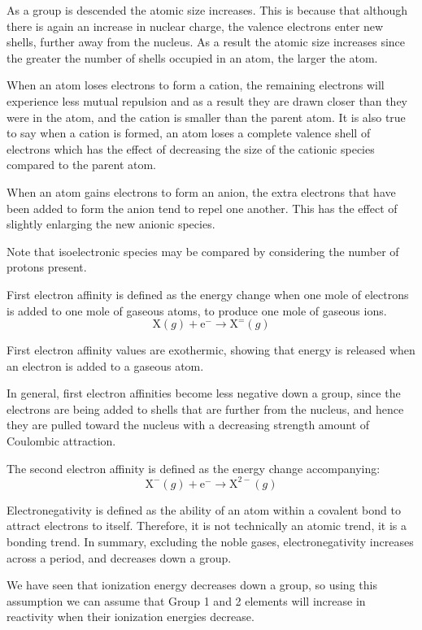 \documentclass[../chem.tex]{subfiles}
\begin{document}
As a group is descended the atomic size increases. This is because that although there is again an increase in nuclear charge, the valence 
electrons enter new shells, further away from the nucleus. As a result the atomic size increases since the greater the number of shells occupied in an atom, the larger the atom.

When an atom loses electrons to form a cation, the remaining electrons will experience less mutual repulsion and as a result they are drawn 
closer than they were in the atom, and the cation is smaller than the parent atom. It is also true to say when a cation is formed, an atom loses a 
complete valence shell of electrons which has the effect of decreasing the size of the cationic species compared to the parent atom.

When an atom gains electrons to form an anion, the extra electrons that have been added to form the anion tend to repel one another.
This has the effect of slightly enlarging the new anionic species.

Note that isoelectronic species may be compared by considering the number of protons present.

First electron affinity is defined as the energy change when one mole of electrons is added to one mole of gaseous atoms, to produce one mole of gaseous ions.
\[\text{X}(g)+\text{e}^-\rightarrow \text{X}^=(g)\]

First electron affinity values are exothermic, showing that energy is released when an electron is added to a gaseous atom.

In general, first electron affinities become less negative down a group, since the electrons are being added to shells that are further from the nucleus, 
and hence they are pulled toward the nucleus with a decreasing strength amount of Coulombic attraction. 

The second electron affinity is defined as the energy change accompanying:
\[\text{X}^-(g)+\text{e}^-\rightarrow \text{X}^{2-}(g)\]

Electronegativity is defined as the ability of an atom within a covalent bond to attract electrons to itself. Therefore, it is not 
technically an atomic trend, it is a bonding trend. In summary, excluding the noble gases, electronegativity increases across a period,
and decreases down a group.

We have seen that ionization energy decreases down a group, so using this assumption we can assume that Group 1 and 2 elements will increase in reactivity when their ionization energies decrease. 
\end{document}
